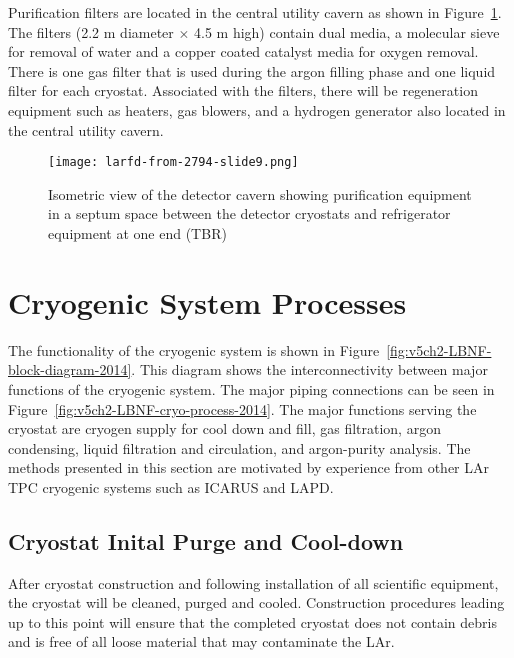 

Purification filters are located in the central utility cavern 
as shown in Figure~\ref{fig:det-cavern-purif}. The filters (2.2 m
diameter $\times$ 4.5 m high) contain dual media, a molecular sieve for removal of water and a copper
coated catalyst media for oxygen removal. There is one gas filter that is used during the argon
filling phase and one liquid filter for each cryostat. 
Associated with the
filters, there will be regeneration equipment such as heaters, gas blowers, and a hydrogen
generator also located in the central utility cavern.

\begin{figure}[htbp]
\centering
\texttt{[image: larfd-from-2794-slide9.png]} 
\caption{Isometric view of the detector cavern showing purification equipment in a septum
space between the detector cryostats and refrigerator equipment at one end (TBR)}
\label{fig:det-cavern-purif}
\end{figure}


\chapter{Cryogenic System Processes}
\label{sec:cryo-crysys-proc}
The functionality of the cryogenic system is
shown in Figure~\ref{fig:v5ch2-LBNF-block-diagram-2014}. This diagram shows
the interconnectivity between major functions of the cryogenic system. The major piping
connections can be seen in Figure~\ref{fig:v5ch2-LBNF-cryo-process-2014}. The major functions serving the
cryostat are cryogen supply for cool down and fill, gas
filtration, argon condensing, liquid filtration and circulation, 
and argon-purity analysis. 
The methods presented in this section are motivated by
experience from other LAr TPC cryogenic systems such as ICARUS and LAPD.

\section{Cryostat Inital Purge and Cool-down}

After cryostat construction and following installation of all scientific equipment, the cryostat
will be cleaned, purged and cooled. Construction procedures leading up to this point will
ensure that the completed cryostat does not contain debris and is free
of all loose material that may contaminate the LAr.

